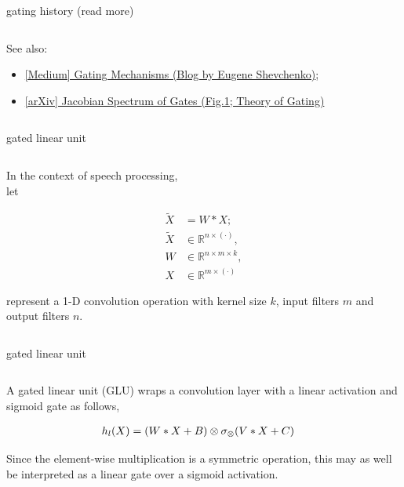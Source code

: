 \documentclass[aspectratio=169,xcolor={dvipsnames,svgnames}]{beamer}
\begin{document}
\begin{frame}[label={sec:org791ee0a}]{gating history (read more)}
\begin{columns}
\begin{column}{0.45\columnwidth}
\alert{See also:}
\begin{itemize}
\item \href{https://medium.com/@eugenesh4work/gating-mechanisms-in-neural-networks-dc83a0bdb8c3}{[Medium] Gating Mechanisms (Blog by Eugene
Shevchenko)};
\item \href{https://arxiv.org/abs/2007.14823}{[arXiv] Jacobian Spectrum of Gates (Fig.1; Theory of
Gating)}
\end{itemize}
\end{column}
\end{columns}
\end{frame}

\begin{frame}[label={sec:gated-linear-unit}]{gated linear unit}
\begin{columns}
\begin{column}{0.45\columnwidth}
In the context of speech processing, \\[0pt]
let

\begin{align*}
\tilde{X}&=W*X; \\
\tilde{X}&\in\mathbb{R}^{n\times(\cdot)}, \\
W&\in\mathbb{R}^{n\times m\times k}, \\
X&\in\mathbb{R}^{m\times(\cdot)}
\end{align*}

represent a 1-D convolution operation with kernel size
\(k\), input filters \(m\) and output filters \(n\).
\end{column}
\end{columns}
\end{frame}

\begin{frame}[label={sec:orgefb8e8e}]{gated linear unit}
\begin{columns}
\begin{column}{0.45\columnwidth}
A gated linear unit (GLU) wraps a convolution layer
with a linear activation and sigmoid gate as follows,

\begin{align}
  \notag
  h_l(X) &= (W*X+B) \otimes \sigma_{\otimes} (V*X+C)
\end{align}

Since the element-wise multiplication is a symmetric
operation, this may as well be interpreted as a linear
gate over a sigmoid activation.
\end{column}
\end{columns}
\end{frame}
\end{document}
